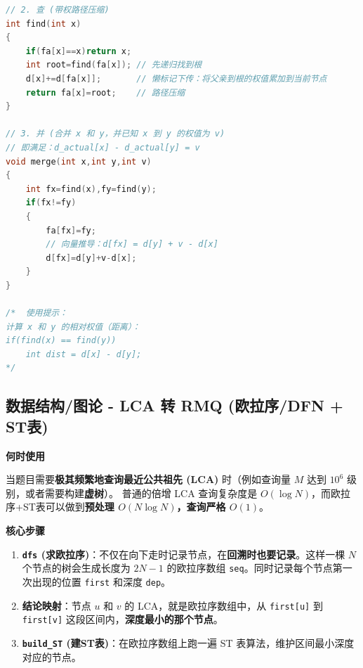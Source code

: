 \documentclass[10pt,landscape,a4paper]{article}
\begin{document}
\begin{multicols*}{3}
\begin{lstlisting}[language=C++]
// 2. 查 (带权路径压缩)
int find(int x)
{
    if(fa[x]==x)return x;
    int root=find(fa[x]); // 先递归找到根
    d[x]+=d[fa[x]];       // 懒标记下传：将父亲到根的权值累加到当前节点
    return fa[x]=root;    // 路径压缩
}

// 3. 并 (合并 x 和 y，并已知 x 到 y 的权值为 v)
// 即满足：d_actual[x] - d_actual[y] = v
void merge(int x,int y,int v)
{
    int fx=find(x),fy=find(y);
    if(fx!=fy)
    {
        fa[fx]=fy;
        // 向量推导：d[fx] = d[y] + v - d[x]
        d[fx]=d[y]+v-d[x];
    }
}

/*  使用提示：
计算 x 和 y 的相对权值（距离）：
if(find(x) == find(y)) 
    int dist = d[x] - d[y];
*/
\end{lstlisting}
\subsection*{数据结构/图论 - LCA 转 RMQ (欧拉序/DFN + ST表)}
\par\addvspace{0.7ex}\noindent\textbf{何时使用}\par\nobreak
当题目需要\textbf{极其频繁地查询最近公共祖先 (LCA)} 时（例如查询量 $M$ 达到 $10^6$ 级别，或者需要构建\textbf{虚树}）。 普通的倍增 LCA 查询复杂度是 $O(\log N)$，而欧拉序+ST表可以做到\textbf{预处理 $O(N \log N)$，查询严格 $O(1)$}。\par
\par\addvspace{0.7ex}\noindent\textbf{核心步骤}\par\nobreak
\begin{enumerate}[start=1]
\item \textbf{\texttt{d\allowbreak{}f\allowbreak{}s} (求欧拉序)}：不仅在向下走时记录节点，在\textbf{回溯时也要记录}。这样一棵 $N$ 个节点的树会生成长度为 $2N-1$ 的欧拉序数组 \texttt{s\allowbreak{}e\allowbreak{}q}。同时记录每个节点第一次出现的位置 \texttt{f\allowbreak{}i\allowbreak{}r\allowbreak{}s\allowbreak{}t} 和深度 \texttt{d\allowbreak{}e\allowbreak{}p}。
\item \textbf{结论映射}：节点 $u$ 和 $v$ 的 LCA，就是欧拉序数组中，从 \texttt{f\allowbreak{}i\allowbreak{}r\allowbreak{}s\allowbreak{}t\allowbreak{}[\allowbreak{}u\allowbreak{}]} 到 \texttt{f\allowbreak{}i\allowbreak{}r\allowbreak{}s\allowbreak{}t\allowbreak{}[\allowbreak{}v\allowbreak{}]} 这段区间内，\textbf{深度最小的那个节点}。
\item \textbf{\texttt{b\allowbreak{}u\allowbreak{}i\allowbreak{}l\allowbreak{}d\allowbreak{}\_\allowbreak{}S\allowbreak{}T} (建ST表)}：在欧拉序数组上跑一遍 ST 表算法，维护区间最小深度对应的节点。

\end{enumerate}
\end{multicols*}
\end{document}
